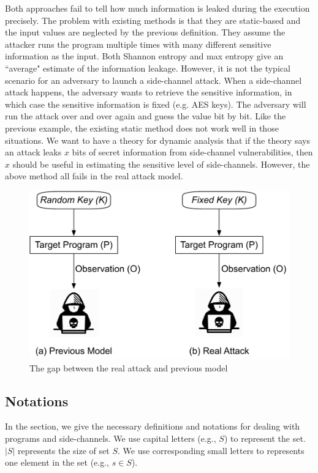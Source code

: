 Both approaches fail to tell how 
much information is leaked during the execution precisely.
The problem with existing methods is that they are static-based and the 
input values are neglected by the previous definition. 
They assume the attacker runs the program multiple times with many different sensitive 
information as the input. Both Shannon entropy and max entropy give an ``average" 
estimate of the information leakage. However, it is not the typical scenario for an adversary to 
launch a side-channel attack. When a side-channel attack happens, the adversary wants 
to retrieve the sensitive information, in which case the sensitive information is fixed (e.g. AES keys). 
The adversary will run the attack over and over again and guess the value bit by bit. Like the 
previous example, the existing static method does not work well in those situations.
We want to have a theory for dynamic analysis that if the theory says 
an attack leaks $x$ bits of secret information from side-channel vulnerabilities,
then $x$ should be useful in estimating the sensitive level of side-channels.
However, the above method all fails in the real attack model.
\begin{figure}
  \centering
   \includegraphics[width=.9\columnwidth]{./figures/RA.pdf}
   \caption{The gap between the real attack and previous model}
\end{figure}


\subsection{Notations}
In the section, we give the necessary definitions and notations for dealing 
with programs and side-channels. We use capital letters (e.g., $S$) to represent 
the set. $|S|$ represents the size of set $S$. We use corresponding small letters
to represents one element in the set (e.g., $s \in S$).


